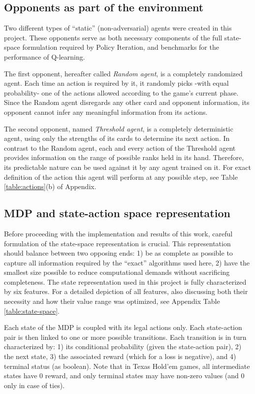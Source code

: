 \subsection{Opponents as part of the environment}
\label{sec:opponents}

Two different types of ``static'' (non-adversarial) agents were created in this project. These opponents serve as both necessary components of the full state-space formulation required by Policy Iteration, and benchmarks for the performance of Q-learning.

The first opponent, hereafter called \textit{Random agent}, is a completely randomized agent. Each time an action is required by it, it randomly picks -with equal probability- one of the actions allowed according to the game's current phase. Since the Random agent disregards any other card and opponent information, its opponent cannot infer any meaningful information from its actions.

The second opponent, named \textit{Threshold agent}, is a completely deterministic agent, using only the strengths of its cards to determine its next action. In contrast to the Random agent, each and every action of the Threshold agent provides information on the range of possible ranks held in its hand. Therefore, its predictable nature can be used against it by any agent trained on it. For exact definition of the action this agent will perform at any possible step, see Table \ref{table:actions}(b) of Appendix.

\subsection{MDP and state-action space representation}
\label{sec:state-space}

Before proceeding with the implementation and results of this work, careful formulation of the state-space representation is crucial. This representation should balance between two opposing ends: 1) be as complete as possible to capture all information required by the ``exact'' algorithms used here, 2) have the smallest size possible to reduce computational demands without sacrificing completeness. The state representation used in this project is fully characterized by six features. For a detailed depiction of all features, also discussing both their necessity and how their value range was optimized, see Appendix Table \ref{table:state-space}.

Each state of the MDP is coupled with its legal actions only. Each state-action pair is then linked to one or more possible transitions. Each transition is in turn characterized by: 1) its conditional probability (given the state-action pair), 2) the next state, 3) the associated reward (which for a loss is negative), and 4) terminal status (as boolean). Note that in Texas Hold'em games, all intermediate states have 0 reward, and only terminal states may have non-zero values (and 0 only in case of ties).

